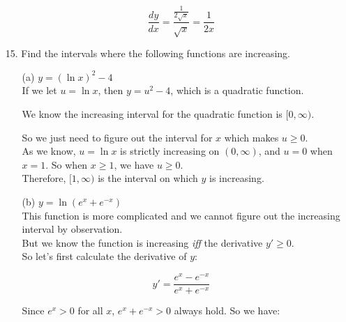 \documentclass{article}
\begin{document}
\begin{enumerate}
\begin{enumerate}
            $$ \frac{dy}{dx} = \frac{ \frac{1}{ 2\sqrt{x} }}{ \sqrt{x} } = \frac{1}{2x} $$
            
        \end{enumerate}
    
    
    
    \item[15.] Find the intervals where the following functions are increasing.
    
        \begin{enumerate}
            
            \item[(a)] $ y = (\ln{x})^2 - 4 $ \\
            
            If we let $u = \ln{x}$, then $y = u^2 - 4$, which is a quadratic function.
            
            We know the increasing interval for the quadratic function is $[0, \infty)$.
            
            So we just need to figure out the interval for $x$ which makes $u  \geq 0$. \\
            
            
            As we know, $u = \ln{x}$ is strictly increasing on $(0, \infty)$, and $u = 0$ when $x = 1$.
            So when $x \geq 1$, we have $ u \geq 0$. \\
            
            Therefore, $[1, \infty)$ is the interval on which $y$ is increasing. \\
            
            \item[(b)] $ y = \ln{ (e^x + e^{-x}) }$ \\
            
            This function is more complicated and we cannot figure out the increasing interval by observation. \\
            
            But we know the function is increasing \textit{iff} the derivative $y' \geq 0$. \\
            
            So let's first calculate the derivative of $y$:
            
            $$ y' = \frac{ e^x - e^{-x} }{ e^x + e^{-x} } $$
            
            Since $e^x > 0$ for all $x$, $ e^x + e^{-x} > 0 $ always hold. So we have:
            

\end{enumerate}
\end{enumerate}
\end{document}
